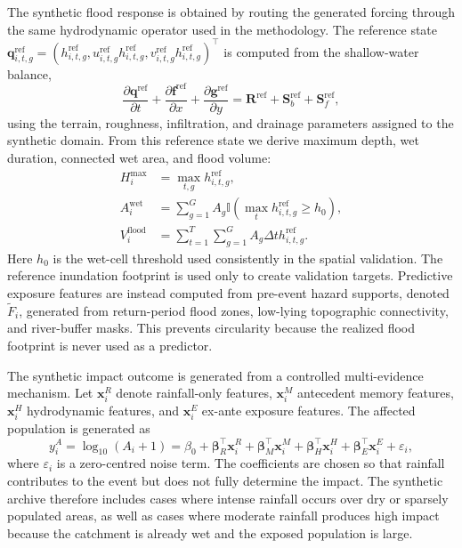 \documentclass[pdflatex,sn-mathphys-ay]{sn-jnl}
\theoremstyle{thmstyleone}
\theoremstyle{thmstylethree}
\theoremstyle{thmstyletwo}
\begin{document}
The synthetic flood response is obtained by routing the generated
forcing through the same hydrodynamic operator used in the methodology.
The reference state
$\mathbf{q}^{\mathrm{ref}}_{i,t,g}
=(h^{\mathrm{ref}}_{i,t,g},
u^{\mathrm{ref}}_{i,t,g}h^{\mathrm{ref}}_{i,t,g},
v^{\mathrm{ref}}_{i,t,g}h^{\mathrm{ref}}_{i,t,g})^{\top}$
is computed from the shallow-water balance,
\begin{equation}
  \frac{\partial \mathbf{q}^{\mathrm{ref}}}{\partial t}
  +
  \frac{\partial \mathbf{f}^{\mathrm{ref}}}{\partial x}
  +
  \frac{\partial \mathbf{g}^{\mathrm{ref}}}{\partial y}
  =
  \mathbf{R}^{\mathrm{ref}}
  +
  \mathbf{S}^{\mathrm{ref}}_{b}
  +
  \mathbf{S}^{\mathrm{ref}}_{f},
  \label{eq:synthetic_reference_swe}
\end{equation}
using the terrain, roughness, infiltration, and drainage parameters
assigned to the synthetic domain.  From this reference state we derive
maximum depth, wet duration, connected wet area, and flood volume:
\begin{align}
  H^{\max}_{i}
  &=
  \max_{t,g}
  h^{\mathrm{ref}}_{i,t,g},
  \label{eq:synthetic_hmax}
  \\
  A^{\mathrm{wet}}_{i}
  &=
  \sum_{g=1}^{G}
  A_g
  \mathbb{I}
  \left(
    \max_t h^{\mathrm{ref}}_{i,t,g}\geq h_0
  \right),
  \label{eq:synthetic_awet}
  \\
  V^{\mathrm{flood}}_{i}
  &=
  \sum_{t=1}^{T}
  \sum_{g=1}^{G}
  A_g\Delta t
  h^{\mathrm{ref}}_{i,t,g}.
  \label{eq:synthetic_volume}
\end{align}
Here $h_0$ is the wet-cell threshold used consistently in the spatial
validation.  The reference inundation footprint is used only to create
validation targets.  Predictive exposure features are instead computed
from pre-event hazard supports, denoted $\widetilde{F}_{i}$, generated
from return-period flood zones, low-lying topographic connectivity,
and river-buffer masks.  This prevents circularity because the realized
flood footprint is never used as a predictor.

The synthetic impact outcome is generated from a controlled
multi-evidence mechanism.  Let $\mathbf{x}^{R}_{i}$ denote
rainfall-only features, $\mathbf{x}^{M}_{i}$ antecedent memory
features, $\mathbf{x}^{H}_{i}$ hydrodynamic features, and
$\mathbf{x}^{E}_{i}$ ex-ante exposure features.  The affected
population is generated as
\begin{equation}
  y^{A}_{i}
  =
  \log_{10}
  \left(
    A_i+1
  \right)
  =
  \beta_0
  +
  \boldsymbol{\beta}^{\top}_{R}
  \mathbf{x}^{R}_{i}
  +
  \boldsymbol{\beta}^{\top}_{M}
  \mathbf{x}^{M}_{i}
  +
  \boldsymbol{\beta}^{\top}_{H}
  \mathbf{x}^{H}_{i}
  +
  \boldsymbol{\beta}^{\top}_{E}
  \mathbf{x}^{E}_{i}
  +
  \varepsilon_i,
  \label{eq:synthetic_impact}
\end{equation}
where $\varepsilon_i$ is a zero-centred noise term.  The coefficients
are chosen so that rainfall contributes to the event but does not fully
determine the impact.  The synthetic archive therefore includes cases
where intense rainfall occurs over dry or sparsely populated areas, as
well as cases where moderate rainfall produces high impact because the
catchment is already wet and the exposed population is large.
\end{document}
